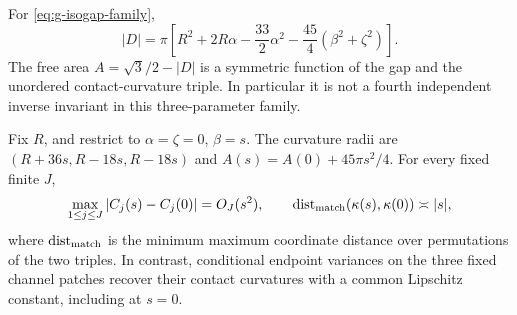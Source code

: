 \begin{proposition}
\label{prop:v3-area-coalescence}
For \eqref{eq:g-isogap-family},
\begin{equation}\label{eq:v3-area}
 |D|=\pi\left[R^2+2R\alpha-\frac{33}{2}\alpha^2
                   -\frac{45}{4}(\beta^2+\zeta^2)\right].
\end{equation}
The free area $A=\sqrt3/2-|D|$ is a symmetric function of the gap
and the unordered contact-curvature triple. In particular it is not a
fourth independent inverse invariant in this three-parameter family.

Fix $R$, and restrict to $\alpha=\zeta=0$, $\beta=s$. The curvature
radii are $(R+36s,R-18s,R-18s)$ and
$A(s)=A(0)+45\pi s^2/4$. For every fixed finite $J$,
\begin{equation}\label{eq:v3-coalescence}
 \max_{1\le j\le J}|C_j(s)-C_j(0)|=O_J(s^2),
 \qquad
 \operatorname{dist}_{\rm match}(\kappa(s),\kappa(0))\asymp |s|,
\end{equation}
where $\operatorname{dist}_{\rm match}$ is the minimum maximum
coordinate distance over permutations of the two triples. In contrast,
conditional endpoint variances on the three fixed channel patches
recover their contact curvatures with a common Lipschitz constant,
including at $s=0$.
\end{proposition}
